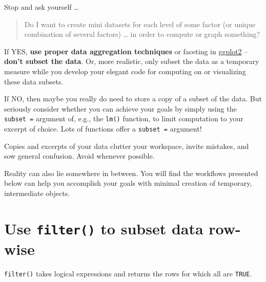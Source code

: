 \documentclass[
]{book}
\begin{document}
Stop and ask yourself \ldots{}

\begin{quote}
Do I want to create mini datasets for each level of some factor (or unique combination of several factors) \ldots{} in order to compute or graph something?
\end{quote}

If YES, \textbf{use proper data aggregation techniques} or faceting in \href{https://ggplot2.tidyverse.org}{ggplot2} -- \textbf{don't subset the data}. Or, more realistic, only subset the data as a temporary measure while you develop your elegant code for computing on or visualizing these data subsets.

If NO, then maybe you really do need to store a copy of a subset of the data. But seriously consider whether you can achieve your goals by simply using the \texttt{subset\ =} argument of, e.g., the \texttt{lm()} function, to limit computation to your excerpt of choice. Lots of functions offer a \texttt{subset\ =} argument!

Copies and excerpts of your data clutter your workspace, invite mistakes, and sow general confusion. Avoid whenever possible.

Reality can also lie somewhere in between. You will find the workflows presented below can help you accomplish your goals with minimal creation of temporary, intermediate objects.

\hypertarget{use-filter-to-subset-data-row-wise}{%
\section{\texorpdfstring{Use \texttt{filter()} to subset data row-wise}{Use filter() to subset data row-wise}}\label{use-filter-to-subset-data-row-wise}}

\texttt{filter()} takes logical expressions and returns the rows for which all are \texttt{TRUE}.
\end{document}
